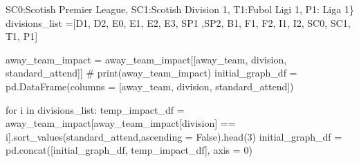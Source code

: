\documentclass[
  letterpaper,
  DIV=11,
  numbers=noendperiod]{scrartcl}
\newenvironment{Shaded}{\begin{snugshade}}{\end{snugshade}}
\newcommand{\CommentTok}[1]{\textcolor[rgb]{0.37,0.37,0.37}{#1}}
\newcommand{\ControlFlowTok}[1]{\textcolor[rgb]{0.00,0.23,0.31}{#1}}
\newcommand{\DecValTok}[1]{\textcolor[rgb]{0.68,0.00,0.00}{#1}}
\newcommand{\KeywordTok}[1]{\textcolor[rgb]{0.00,0.23,0.31}{#1}}
\newcommand{\NormalTok}[1]{\textcolor[rgb]{0.00,0.23,0.31}{#1}}
\newcommand{\OperatorTok}[1]{\textcolor[rgb]{0.37,0.37,0.37}{#1}}
\newcommand{\StringTok}[1]{\textcolor[rgb]{0.13,0.47,0.30}{#1}}
\newcommand{\VariableTok}[1]{\textcolor[rgb]{0.07,0.07,0.07}{#1}}
\begin{document}
\begin{Shaded}
\begin{Highlighting}[]
              \StringTok{\textquotesingle{}SC0\textquotesingle{}}\NormalTok{:}\StringTok{\textquotesingle{}Scotish Premier League\textquotesingle{}}\NormalTok{, }\StringTok{\textquotesingle{}SC1\textquotesingle{}}\NormalTok{:}\StringTok{\textquotesingle{}Scotish Division 1\textquotesingle{}}\NormalTok{, }\StringTok{\textquotesingle{}T1\textquotesingle{}}\NormalTok{:}\StringTok{\textquotesingle{}Fubol Ligi 1\textquotesingle{}}\NormalTok{, }\StringTok{\textquotesingle{}P1\textquotesingle{}}\NormalTok{: }\StringTok{\textquotesingle{}Liga 1\textquotesingle{}}\NormalTok{\}}
\NormalTok{divisions\_list }\OperatorTok{=}\NormalTok{[}\StringTok{\textquotesingle{}D1\textquotesingle{}}\NormalTok{, }\StringTok{\textquotesingle{}D2\textquotesingle{}}\NormalTok{, }\StringTok{\textquotesingle{}E0\textquotesingle{}}\NormalTok{, }\StringTok{\textquotesingle{}E1\textquotesingle{}}\NormalTok{, }\StringTok{\textquotesingle{}E2\textquotesingle{}}\NormalTok{, }\StringTok{\textquotesingle{}E3\textquotesingle{}}\NormalTok{, }\StringTok{\textquotesingle{}SP1\textquotesingle{}}\NormalTok{ ,}\StringTok{\textquotesingle{}SP2\textquotesingle{}}\NormalTok{, }\StringTok{\textquotesingle{}B1\textquotesingle{}}\NormalTok{, }\StringTok{\textquotesingle{}F1\textquotesingle{}}\NormalTok{, }\StringTok{\textquotesingle{}F2\textquotesingle{}}\NormalTok{, }\StringTok{\textquotesingle{}I1\textquotesingle{}}\NormalTok{, }\StringTok{\textquotesingle{}I2\textquotesingle{}}\NormalTok{, }\StringTok{\textquotesingle{}SC0\textquotesingle{}}\NormalTok{, }\StringTok{\textquotesingle{}SC1\textquotesingle{}}\NormalTok{, }\StringTok{\textquotesingle{}T1\textquotesingle{}}\NormalTok{, }\StringTok{\textquotesingle{}P1\textquotesingle{}}\NormalTok{]}

\NormalTok{away\_team\_impact }\OperatorTok{=}\NormalTok{ away\_team\_impact[[}\StringTok{\textquotesingle{}away\_team\textquotesingle{}}\NormalTok{, }\StringTok{\textquotesingle{}division\textquotesingle{}}\NormalTok{, }\StringTok{\textquotesingle{}standard\_attend\textquotesingle{}}\NormalTok{]]}
\CommentTok{\# print(away\_team\_impact)}
\NormalTok{initial\_graph\_df }\OperatorTok{=}\NormalTok{ pd.DataFrame(columns }\OperatorTok{=}\NormalTok{ [}\StringTok{\textquotesingle{}away\_team\textquotesingle{}}\NormalTok{, }\StringTok{\textquotesingle{}division\textquotesingle{}}\NormalTok{, }\StringTok{\textquotesingle{}standard\_attend\textquotesingle{}}\NormalTok{])}

\ControlFlowTok{for}\NormalTok{ i }\KeywordTok{in}\NormalTok{ divisions\_list:}
\NormalTok{        temp\_impact\_df }\OperatorTok{=}\NormalTok{ away\_team\_impact[away\_team\_impact[}\StringTok{\textquotesingle{}division\textquotesingle{}}\NormalTok{] }\OperatorTok{==}\NormalTok{ i].sort\_values(}\StringTok{\textquotesingle{}standard\_attend\textquotesingle{}}\NormalTok{,ascending }\OperatorTok{=} \VariableTok{False}\NormalTok{).head(}\DecValTok{3}\NormalTok{)}
\NormalTok{        initial\_graph\_df }\OperatorTok{=}\NormalTok{ pd.concat([initial\_graph\_df, temp\_impact\_df], axis }\OperatorTok{=} \DecValTok{0}\NormalTok{)}



\end{Highlighting}
\end{Shaded}
\end{document}
